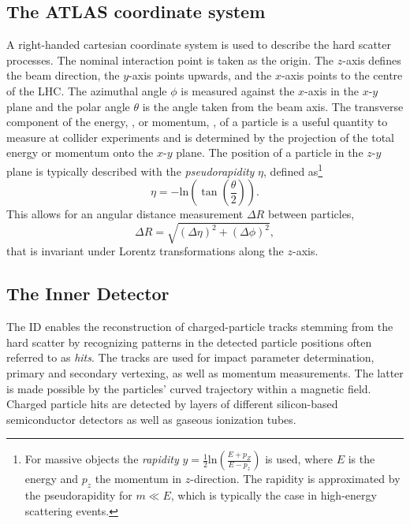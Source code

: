 \subsection{The ATLAS coordinate system}
A right-handed cartesian coordinate system is used to describe the hard scatter processes. The nominal interaction point is taken as the origin. The $z$-axis defines the beam direction, the $y$-axis points upwards, and the $x$-axis points to the centre of the LHC. The azimuthal angle $\phi$ is measured against the $x$-axis in the $x$-$y$ plane and the polar angle $\theta$ is the angle taken from the beam axis. 
The transverse component of the energy, \ET, or momentum, \pT, of a particle is a useful quantity to measure at collider experiments and is determined by the projection of the total energy or momentum onto the $x$-$y$ plane.
The position of a particle in the $z$-$y$ plane is typically described with the \emph{pseudorapidity} $\eta$, defined as\footnote{For massive objects the \emph{rapidity} $y = \frac{1}{2} \text{ln} \left( \frac{E + p_Z }{E-p_z} \right)$ is used, where $E$ is the energy and $p_z$ the momentum in $z$-direction. The rapidity is approximated by the pseudorapidity for $m \ll E$, which is typically the case in high-energy scattering events.}
\begin{equation}
    \eta = - \text{ln} \left( \tan \left( \frac{\theta}{2} \right) \right).
\end{equation}
This allows for an angular distance measurement $\Delta R$ between particles,
\begin{equation}
    \Delta R = \sqrt{ \left( \Delta \eta \right) ^2 + \left( \Delta \phi \right) ^2 },
\end{equation}
that is invariant under Lorentz transformations along the $z$-axis. 



\subsection{The Inner Detector}
\label{subsec:inner-detector}
The ID enables the reconstruction of charged-particle tracks stemming from the hard scatter by recognizing patterns in the detected particle positions often referred to as \emph{hits}. The tracks are used for impact parameter determination, primary and secondary vertexing, as well as momentum measurements. The latter is made possible by the particles' curved trajectory within a magnetic field.
Charged particle hits are detected by layers of different silicon-based semiconductor detectors as well as gaseous ionization tubes.

